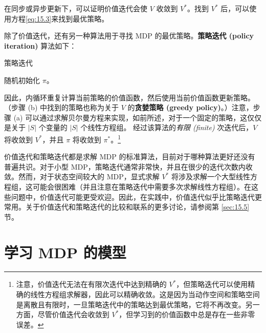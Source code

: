 在同步或异步更新下，可以证明价值迭代会使 $V$ 收敛到 $V^*$。找到 $V^*$ 后，可以使用方程\eqref{eq:15.3}来找到最优策略。

除了价值迭代，还有另一种算法用于寻找 MDP 的最优策略。\textbf{策略迭代 (policy iteration)} 算法如下：

\vspace{0.5em}
\begin{algorithm}[H]
    \SetAlgoNoLine
    \label{algo:5}
    \caption{策略迭代}
    随机初始化 $\pi$。\\
\end{algorithm}

因此，内循环重复计算当前策略的价值函数，然后使用当前价值函数更新策略。（步骤 (b) 中找到的策略也称为关于 $V$ 的\textbf{贪婪策略 (greedy policy)}。）注意，步骤 (a) 可以通过求解贝尔曼方程来实现，如前所述，对于一个固定的策略，这仅仅是关于 $|S|$ 个变量的 $|S|$ 个线性方程组。
经过该算法的\textit{有限 (finite)} 次迭代后，$V$ 将收敛到 $V^*$，并且 $\pi$ 将收敛到 $\pi^*$。\footnote{注意，价值迭代无法在有限次迭代中达到精确的 $V^*$，但策略迭代可以使用精确的线性方程组求解器，因此可以精确收敛。这是因为当动作空间和策略空间是离散且有限时，一旦策略迭代中的策略达到最优策略，它将不再改变。另一方面，尽管价值迭代会收敛到 $V^*$，但学习到的价值函数中总是存在一些非零误差。}

价值迭代和策略迭代都是求解 MDP 的标准算法，目前对于哪种算法更好还没有普遍共识。对于小型 MDP，策略迭代通常非常快，并且在很少的迭代次数内收敛。然而，对于状态空间较大的 MDP，显式求解 $V^*$ 将涉及求解一个大型线性方程组，这可能会很困难（并且注意在策略迭代中需要多次求解线性方程组）。在这些问题中，价值迭代可能更受欢迎。因此，在实践中，价值迭代似乎比策略迭代更常用。关于价值迭代和策略迭代的比较和联系的更多讨论，请参阅第 \ref{sec:15.5} 节。

\section{学习 MDP 的模型}

